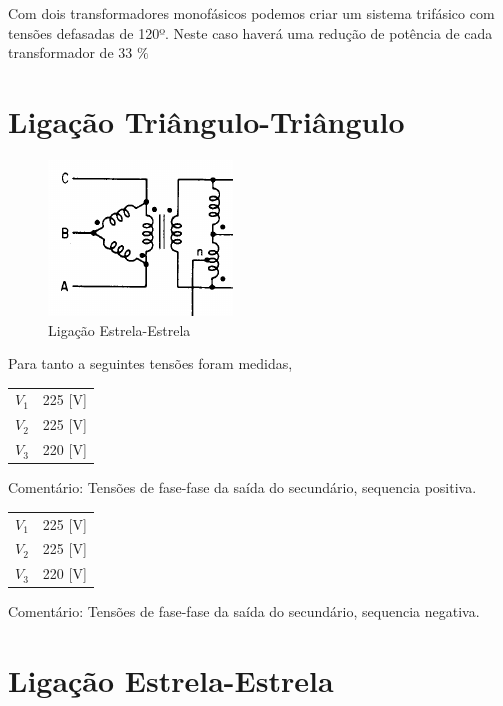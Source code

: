 \documentclass[paper=a4, fontsize=11pt]{article}
\begin{document}
Com dois transformadores monofásicos podemos criar um sistema trifásico com tensões
defasadas de 120º. Neste caso haverá uma redução de potência de cada transformador
de 33 $\%$

\section{Ligação Triângulo-Triângulo}
\begin{figure}[!ht]
    \centering
    \includegraphics[scale=.8]{delta}
    \caption{Ligação Estrela-Estrela}
\end{figure}
Para tanto a seguintes tensões foram medidas,

\begin{center}
    \begin{tabular}{c||c}
        $V_1$ & 225 [V] \\
        $V_2$ & 225 [V] \\
        $V_3$ & 220 [V] \\
    \end{tabular}
\end{center}

Comentário: Tensões de fase-fase da saída do secundário, sequencia positiva.

\begin{center}
    \begin{tabular}{c||c}
        $V_1$ & 225 [V] \\
        $V_2$ & 225 [V] \\
        $V_3$ & 220 [V] \\
    \end{tabular}
\end{center}

Comentário: Tensões de fase-fase da saída do secundário, sequencia negativa.

\section{Ligação Estrela-Estrela}
\end{document}
